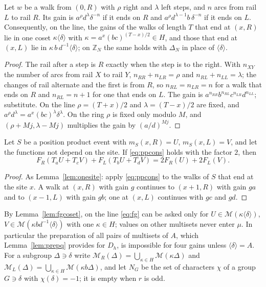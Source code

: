 \begin{lemma}\label{lem:fgcoset}
Let $w$ be a walk from $(0,R)$ with $\rho$ right and $\lambda$ left steps, and $n$ arcs from rail $L$ to rail $R$. Its gain is $a^{\rho}d^{\lambda}\delta^{-n}$ if it ends on $R$ and $a^{\rho}d^{\lambda-1}b\,\delta^{-n}$ if it ends on $L$. Consequently, on the line, the gains of the walks of length $T$ that end at $(x,R)$ lie in one coset $\kappa\langle\delta\rangle$ with $\kappa=a^{x}(bc)^{(T-x)/2}\in H$, and those that end at $(x,L)$ lie in $\kappa\,b\,d^{-1}\langle\delta\rangle$; on $\mathbb{Z}_N$ the same holds with $\Delta_N$ in place of $\langle\delta\rangle$.
\end{lemma}
\begin{proof}
The rail after a step is $R$ exactly when the step is to the right. With $n_{XY}$ the number of arcs from rail $X$ to rail $Y$, $n_{RR}+n_{LR}=\rho$ and $n_{RL}+n_{LL}=\lambda$; the changes of rail alternate and the first is from $R$, so $n_{RL}=n_{LR}=n$ for a walk that ends on $R$ and $n_{RL}=n+1$ for one that ends on $L$. The gain is $a^{n_{RR}}b^{n_{RL}}c^{n_{LR}}d^{n_{LL}}$; substitute. On the line $\rho=(T+x)/2$ and $\lambda=(T-x)/2$ are fixed, and $a^{\rho}d^{\lambda}=a^{x}(bc)^{\lambda}\delta^{\lambda}$. On the ring $\rho$ is fixed only modulo $M$, and $(\rho+Mj,\lambda-Mj)$ multiplies the gain by $(a/d)^{Mj}$.
\end{proof}

\begin{lemma}\label{lem:fgonesite}
Let $S$ be a position product event with $m_S(x,R)=U$, $m_S(x,L)=V$, and let the functions not depend on the site. If \eqref{eq:ppcons} holds with the factor $2$, then
\begin{equation}\label{eq:fg}
F_R(T_aU+T_cV)+F_L(T_bU+T_dV)=2F_R(U)+2F_L(V).
\end{equation}
\end{lemma}
\begin{proof}
As Lemma~\ref{lem:onesite}: apply \eqref{eq:ppcons} to the walks of $S$ that end at the site $x$. A walk at $(x,R)$ with gain $g$ continues to $(x+1,R)$ with gain $ga$ and to $(x-1,L)$ with gain $gb$; one at $(x,L)$ continues with $gc$ and $gd$.
\end{proof}

By Lemma~\ref{lem:fgcoset}, on the line \eqref{eq:fg} can be asked only for $U\in\mathcal{M}(\kappa\langle\delta\rangle)$, $V\in\mathcal{M}(\kappa bd^{-1}\langle\delta\rangle)$ with one $\kappa\in H$; values on other multisets never enter $\mu$. In particular the preparation of all pairs of multisets of $A$, which Lemma~\ref{lem:prepq} provides for $D_h$, is impossible for four gains unless $\langle\delta\rangle=A$. For a subgroup $\Delta\ni\delta$ write $\mathcal{M}_R(\Delta)=\bigcup_{\kappa\in H}\mathcal{M}(\kappa\Delta)$ and $\mathcal{M}_L(\Delta)=\bigcup_{\kappa\in H}\mathcal{M}(\kappa b\Delta)$, and let $N_G$ be the set of characters $\chi$ of a group $G\ni\delta$ with $\chi(\delta)=-1$; it is empty when $r$ is odd.

